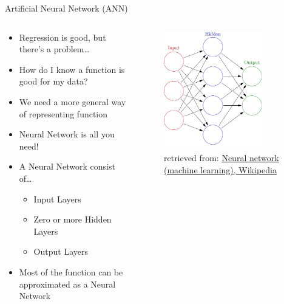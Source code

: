 \documentclass[10pt,xcolor={table,dvipsnames},t]{beamer}
\begin{document}
\begin{frame}{Artificial Neural Network (ANN)}
  \begin{columns}
    \begin{column}[T]{0.6\textwidth}
      \begin{itemize}
        \item Regression is good, but there's a problem\dots
        \item How do I know a function is good for my data?
        \item We need a more general way of representing function
        \item Neural Network is all you need!
        \item A Neural Network consist of\dots
        \begin{itemize}
          \item Input Layers
          \item Zero or more Hidden Layers
          \item Output Layers
        \end{itemize}
        \item Most of the function can be approximated as a Neural Network
      \end{itemize}
    \end{column}
    \begin{column}[T]{0.4\textwidth}
      \begin{figure}
        \includegraphics[width=0.8\textwidth]{img/Colored_neural_network.png}
        \caption{retrieved from: \href{https://en.wikipedia.org/wiki/Neural_network_(machine_learning)}{Neural network (machine learning), Wikipedia}}
      \end{figure}
    \end{column}
  \end{columns}
\end{frame}
\end{document}
